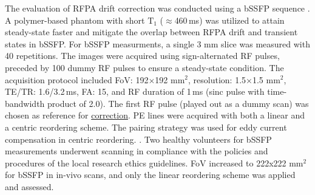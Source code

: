 The evaluation of RFPA drift correction was conducted using a bSSFP sequence . A polymer-based phantom with short $\text{T}_1$ ($\approx$460\,ms) was utilized to attain steady-state faster and mitigate the overlap between RFPA drift and transient states in bSSFP. For bSSFP measurments, a single 3 mm slice was measured with 40 repetitions. The images were acquired using sign-alternated RF pulses, preceded by 100 dummy RF pulses to ensure a steady-state condition. The acquisition protocol included FoV: 192$\times$192 mm$^{2}$, resolution: 1.5$\times$1.5 mm$^{2}$, TE/TR: 1.6/3.2\,ms, FA: 15\textdegree, and RF duration of 1\,ms (sinc pulse with time-bandwidth product of 2.0). The first RF pulse (played out as a dummy scan) was chosen as reference for \hyperlink{subsubsection.2.3.2}{ correction}. PE lines were acquired with both a linear and a centric reordering scheme. The pairing strategy was used for eddy current compensation in centric reordering. \cite{Bieri2005} . Two healthy volunteers for bSSFP measurements  underwent scanning in compliance with the policies and procedures of the local research ethics guidelines. FoV increased to 222x222 mm$^{2}$ for bSSFP in in-vivo scans, and only the linear reordering scheme was applied and assessed.


